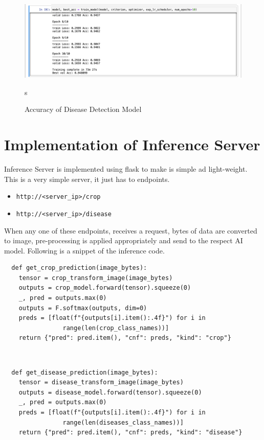 \documentclass[../Report.tex]{subfiles}
\begin{document}
\begin{description}
  \begin{figure}[H]
    \centering
    \includegraphics[width=\linewidth]{images/disease_acc.png}
    \caption{Accuracy of Disease Detection Model}
    \label{fig:disease_acc}s
  \end{figure}

\end{description}

\section{Implementation of Inference Server} \label{sec:inference_server}

Inference Server is implemented using flask to make is simple ad light-weight. This is a very simple server, it just has to endpoints.

\begin{itemize}
  \item \texttt{http://<server\_ip>/crop}
  \item \texttt{http://<server\_ip>/disease}
\end{itemize}

When any one of these endpoints, receives a request, bytes of data are converted to image, pre-processing is applied appropriately 
and send to the respect AI model. Following is a snippet of the inference code.

\begin{verbatim}
  def get_crop_prediction(image_bytes):
    tensor = crop_transform_image(image_bytes)
    outputs = crop_model.forward(tensor).squeeze(0)
    _, pred = outputs.max(0)
    outputs = F.softmax(outputs, dim=0)
    preds = [float(f"{outputs[i].item():.4f}") for i in 
                range(len(crop_class_names))]
    return {"pred": pred.item(), "cnf": preds, "kind": "crop"}
\end{verbatim}
 ~\par

\begin{verbatim}
  def get_disease_prediction(image_bytes):
    tensor = disease_transform_image(image_bytes)
    outputs = disease_model.forward(tensor).squeeze(0)
    _, pred = outputs.max(0)
    preds = [float(f"{outputs[i].item():.4f}") for i in 
                range(len(diseases_class_names))]
    return {"pred": pred.item(), "cnf": preds, "kind": "disease"}
\end{verbatim}
 ~\par
\end{document}
